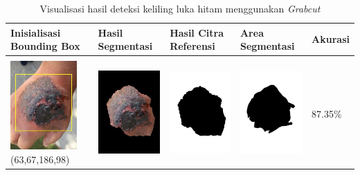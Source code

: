 \begin{table}[H]
	\centering
	\caption{Visualisasi hasil deteksi keliling luka hitam menggunakan \emph{Grabcut}}
	\label{tabel_hasil_5}
	\begin{tabular}{|m{1.0in}|m{1.0in}|m{1.0in}|m{1.0in}|m{0.6in}|}
		\hline
		\textbf{Inisialisasi Bounding Box} & \textbf{Hasil Segmentasi} & \textbf{Hasil Citra Referensi} & \textbf{Area Segmentasi} & \textbf{Akurasi} \\
		\hline

		&  &  & \\
		\includegraphics[width=1.0in]{gambar/hasil_segmentasi/luka_hitam/image_31_rect.jpg} {\centering\fontsize{10}{10}\selectfont(63,67,186,98)}&
		\includegraphics[width=1.0in]{gambar/hasil_segmentasi/luka_hitam/result_31.jpg}&
		\includegraphics[width=1.0in]{gambar/hasil_segmentasi/luka_hitam/mask_r_31.jpg}&
		\includegraphics[width=1.0in]{gambar/hasil_segmentasi/luka_hitam/31_r.jpg}&
		87.35\% \\
		\hline 


\end{tabular}
\end{table}
